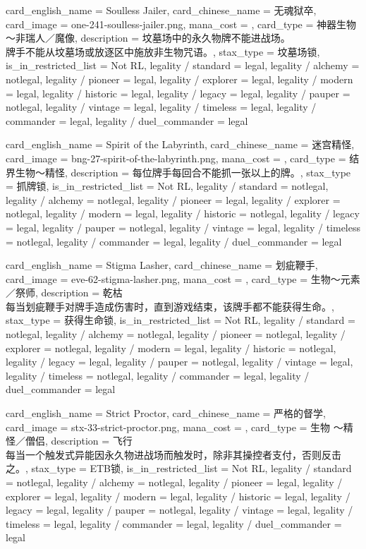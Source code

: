 \documentclass[lang = cn, color = black, 10pt]{AllThatStax}
\begin{document}
\card
{
	card_english_name = {Soulless Jailer},
	card_chinese_name = {无魂狱卒},
	card_image = one-241-soulless-jailer.png,
	mana_cost = ,
	card_type = 神器生物 ～非瑞人／魔像,
	description = {坟墓场中的永久物牌不能进战场。\\
		牌手不能从坟墓场或放逐区中施放非生物咒语。},
	stax_type = 坟墓场锁,
	is_in_restricted_list = Not RL,
	legality / standard = legal,
	legality / alchemy = notlegal,
	legality / pioneer = legal,
	legality / explorer = legal,
	legality / modern = legal,
	legality / historic = legal,
	legality / legacy = legal,
	legality / pauper = notlegal,
	legality / vintage = legal,
	legality / timeless = legal,
	legality / commander = legal,
	legality / duel_commander = legal
}

\card
{
	card_english_name = {Spirit of the Labyrinth},
	card_chinese_name = {迷宫精怪},
	card_image = bng-27-spirit-of-the-labyrinth.png,
	mana_cost = ,
	card_type = 结界生物～精怪,
	description = {每位牌手每回合不能抓一张以上的牌。},
	stax_type = 抓牌锁,
	is_in_restricted_list = Not RL,
	legality / standard = notlegal,
	legality / alchemy = notlegal,
	legality / pioneer = legal,
	legality / explorer = notlegal,
	legality / modern = legal,
	legality / historic = notlegal,
	legality / legacy = legal,
	legality / pauper = notlegal,
	legality / vintage = legal,
	legality / timeless = notlegal,
	legality / commander = legal,
	legality / duel_commander = legal
}

\card
{
	card_english_name = {Stigma Lasher},
	card_chinese_name = {划疵鞭手},
	card_image = eve-62-stigma-lasher.png,
	mana_cost = ,
	card_type = 生物～元素／祭师,
	description = {乾枯 \\
		每当划疵鞭手对牌手造成伤害时，直到游戏结束，该牌手都不能获得生命。},
	stax_type = 获得生命锁,
	is_in_restricted_list = Not RL,
	legality / standard = notlegal,
	legality / alchemy = notlegal,
	legality / pioneer = notlegal,
	legality / explorer = notlegal,
	legality / modern = legal,
	legality / historic = notlegal,
	legality / legacy = legal,
	legality / pauper = notlegal,
	legality / vintage = legal,
	legality / timeless = notlegal,
	legality / commander = legal,
	legality / duel_commander = legal
}

\card
{
	card_english_name = {Strict Proctor},
	card_chinese_name = {严格的督学},
	card_image = stx-33-strict-proctor.png,
	mana_cost = ,
	card_type = 生物 ～精怪／僧侣,
	description = {飞行\\
		每当一个触发式异能因永久物进战场而触发时，除非其操控者支付，否则反击之。},
	stax_type = ETB锁,
	is_in_restricted_list = Not RL,
	legality / standard = notlegal,
	legality / alchemy = notlegal,
	legality / pioneer = legal,
	legality / explorer = legal,
	legality / modern = legal,
	legality / historic = legal,
	legality / legacy = legal,
	legality / pauper = notlegal,
	legality / vintage = legal,
	legality / timeless = legal,
	legality / commander = legal,
	legality / duel_commander = legal
}
\end{document}
